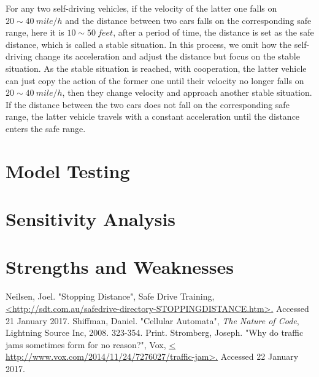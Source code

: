 \documentclass[a4paper]{article}
\begin{document}
\begin{itemize}
		For any two self-driving vehicles, if the velocity of the latter one falls on $ 20\sim 40\  mile/h $ and the distance between two cars falls on the corresponding safe range, here it is $ 10\sim50\  feet$, after a period of time, the distance is set as the safe distance, which is called a stable situation. In this process, we omit how the self-driving change its acceleration and adjust the distance but focus on the stable situation. As the stable situation is reached, with cooperation, the latter vehicle can just copy the action of the former one until their velocity no longer falls on $ 20\sim 40\  mile/h $, then they change velocity and approach another stable situation. If the distance between the two cars does not fall on the corresponding safe range, the latter vehicle travels with a constant acceleration until the distance enters the safe range.
	\end{itemize}
	
	
	
	\section{Model Testing}
	\section{Sensitivity Analysis}
	\section{Strengths and Weaknesses}
	
	
	
	
	
	
	
	\begin{thebibliography}{0}
		 Neilsen, Joel. "Stopping Distance", Safe Drive Training,  \url{<http://sdt.com.au/safedrive-directory-STOPPINGDISTANCE.htm>.} Accessed 21 January 2017. 
		\bibitem{} Shiffman, Daniel. "Cellular Automata", \textit{The Nature of Code}, Lightning Source Inc, 2008. 323-354. Print.
		 Stromberg, Joseph. "Why do traffic jams sometimes form for no reason?", Vox, \url{< http://www.vox.com/2014/11/24/7276027/traffic-jam>.} Accessed 22 January 2017. 
	\end{thebibliography}
	
\end{document}
